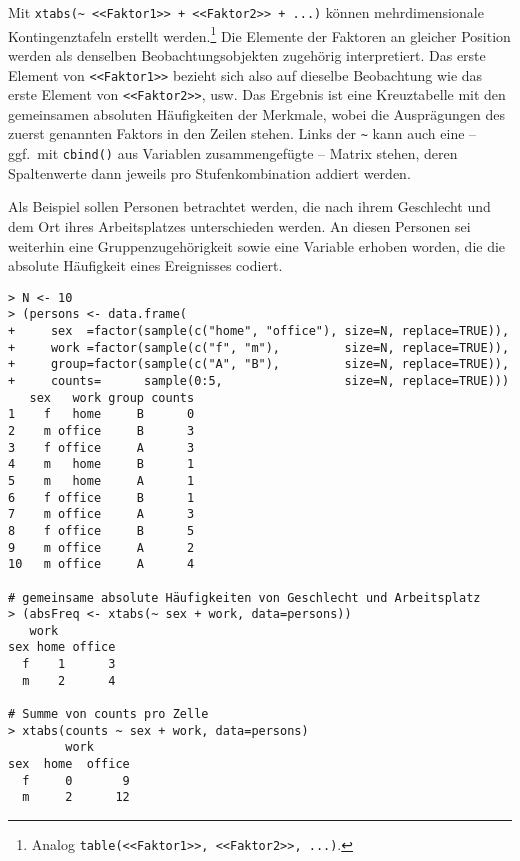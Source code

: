 Mit \lstinline!xtabs(~ <<Faktor1>> + <<Faktor2>> + ...)! können mehrdimensionale Kontingenztafeln erstellt werden.\footnote{Analog \lstinline!table(<<Faktor1>>, <<Faktor2>>, ...)!.} Die Elemente der Faktoren an gleicher Position werden als denselben Beobachtungsobjekten zugehörig interpretiert. Das erste Element von \lstinline!<<Faktor1>>! bezieht sich also auf dieselbe Beobachtung wie das erste Element von \lstinline!<<Faktor2>>!, usw. Das Ergebnis ist eine Kreuztabelle mit den gemeinsamen absoluten Häufigkeiten der Merkmale, wobei die Ausprägungen des zuerst genannten Faktors in den Zeilen stehen. Links der \lstinline!~! kann auch eine -- ggf.\ mit \lstinline!cbind()! aus Variablen zusammengefügte -- Matrix stehen, deren Spaltenwerte dann jeweils pro Stufenkombination addiert werden.

Als Beispiel sollen Personen betrachtet werden, die nach ihrem Geschlecht und dem Ort ihres Arbeitsplatzes unterschieden werden. An diesen Personen sei weiterhin eine Gruppenzugehörigkeit sowie eine Variable erhoben worden, die die absolute Häufigkeit eines Ereignisses codiert.
\begin{lstlisting}
> N <- 10
> (persons <- data.frame(
+     sex  =factor(sample(c("home", "office"), size=N, replace=TRUE)),
+     work =factor(sample(c("f", "m"),         size=N, replace=TRUE)),
+     group=factor(sample(c("A", "B"),         size=N, replace=TRUE)),
+     counts=      sample(0:5,                 size=N, replace=TRUE)))
   sex   work group counts
1    f   home     B      0
2    m office     B      3
3    f office     A      3
4    m   home     B      1
5    m   home     A      1
6    f office     B      1
7    m office     A      3
8    f office     B      5
9    m office     A      2
10   m office     A      4

# gemeinsame absolute Häufigkeiten von Geschlecht und Arbeitsplatz
> (absFreq <- xtabs(~ sex + work, data=persons))
   work
sex home office
  f    1      3
  m    2      4

# Summe von counts pro Zelle
> xtabs(counts ~ sex + work, data=persons)
        work
sex  home  office
  f     0       9
  m     2      12
\end{lstlisting}

